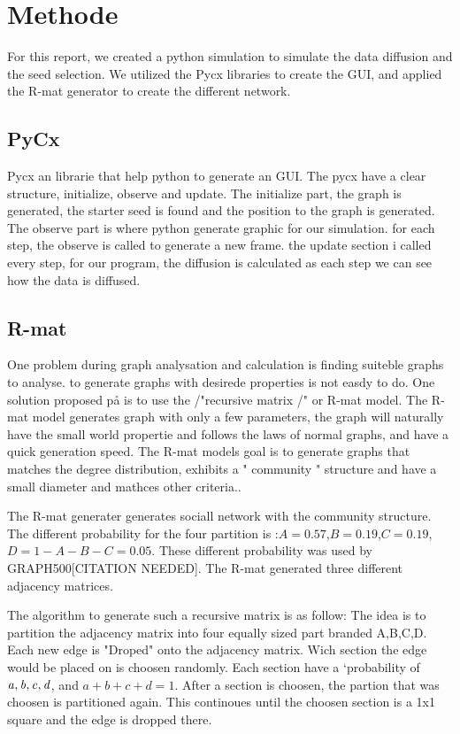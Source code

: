 \chapter{Methode}
For this report, we created a python simulation to simulate the data diffusion and the seed selection. We utilized the Pycx libraries to create the GUI, and applied the R-mat generator to create the different network.

\section{PyCx}
Pycx an librarie that help python to generate an GUI. The pycx have a clear structure, initialize, observe and update. The initialize part, the graph is generated, the starter seed is found and the position to the graph is generated. The observe part is where python generate graphic for our simulation. for each step, the observe is called to generate a new frame. the update section i called every step, for our program, the diffusion is calculated as each step we can see how the data is diffused.


\section{R-mat}
One problem during graph analysation and calculation is finding suiteble graphs to analyse. to generate graphs with desirede properties is not easdy to do. One solution proposed på \cite{RMat2004} is to use the /"recursive matrix /" or R-mat model. The R-mat model generates graph with only a few parameters, the graph will naturally have the small world propertie and follows the laws of normal graphs, and have a quick generation speed. The R-mat models goal is to generate graphs that matches the degree distribution, exhibits a " community " structure and have a small diameter and mathces other criteria.\cite{Rmat2004}.

The R-mat generater generates sociall network with the community structure. The different probability for the four partition is :$A=0.57$,$B=0.19$,$C=0.19$,$D = 1-A-B-C = 0.05$. These different probability was used by GRAPH500[CITATION NEEDED]. The R-mat generated three different adjacency matrices.


The algorithm to generate such a recursive matrix is as follow: The idea is to partition the adjacency matrix into four equally sized part branded A,B,C,D. Each new edge is "Droped" onto the adjacency matrix. Wich section the edge would be placed on is choosen randomly. Each section have a `probability of $\it{a, b, c, d}$, and $a + b + c + d = 1$. After a section is choosen, the partion that was choosen is partitioned again. This continoues until the choosen section is a 1x1 square and the edge is dropped there. 

